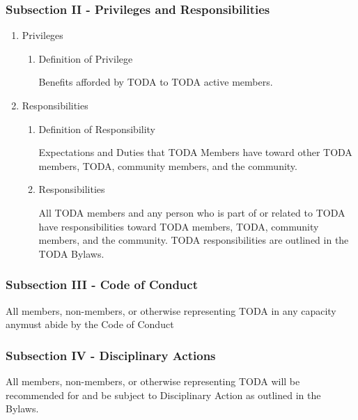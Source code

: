\documentclass[11pt]{article}
\begin{document}
\subsubsection{Subsection II - Privileges and Responsibilities}
\label{sec:org98078fd}

\begin{enumerate}
\item Privileges
\label{sec:org3cfc87e}

\begin{enumerate}
\item Definition of Privilege
\label{sec:org5600273}

Benefits afforded by TODA to TODA active members.
\end{enumerate}

\item Responsibilities
\label{sec:org8bf2cea}

\begin{enumerate}
\item Definition of Responsibility
\label{sec:org97aa963}

Expectations and Duties that TODA Members have toward other TODA members, TODA, community members, and the community.

\item Responsibilities
\label{sec:org2ecfd36}

All TODA members and any person who is part of or related to TODA have responsibilities toward TODA members, TODA, community members, and the community. 
TODA responsibilities are outlined in the TODA Bylaws.
\end{enumerate}
\end{enumerate}

\subsubsection{Subsection III - Code of Conduct}
\label{sec:org2d32d2e}

All members, non-members, or otherwise representing TODA in any capacity anymust abide by the Code of Conduct

\subsubsection{Subsection IV - Disciplinary Actions}
\label{sec:orgc83c631}

All members, non-members, or otherwise representing TODA will be recommended for and be subject to Disciplinary Action as outlined in the Bylaws.
\end{document}
